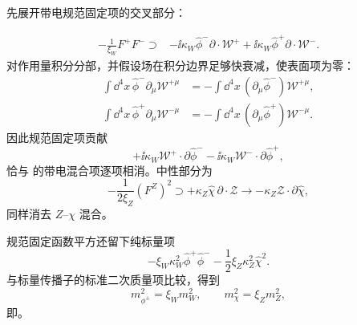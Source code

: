\begin{derivation}
先展开带电规范固定项的交叉部分：

\begin{align*}
 -\frac1{\xi_W}F^+F^-
 \supset{}&-\ii\kappa_W\widehat\phi^-\partial\!\cdot\mathcal W^+
 +\ii\kappa_W\widehat\phi^+\partial\!\cdot\mathcal W^-.
\end{align*}
对作用量积分分部，并假设场在积分边界足够快衰减，使表面项为零：
\begin{align*}
 \int\dd^4 x\,
 \widehat\phi^-\partial_\mu\mathcal W^{+\mu}
 &=-\int\dd^4 x\,
 (\partial_\mu\widehat\phi^-)\mathcal W^{+\mu},\\
 \int\dd^4 x\,
 \widehat\phi^+\partial_\mu\mathcal W^{-\mu}
 &=-\int\dd^4 x\,
 (\partial_\mu\widehat\phi^+)\mathcal W^{-\mu}.
\end{align*}
因此规范固定项贡献
\begin{equation*}
 +\ii\kappa_W\mathcal W^+\!\cdot\partial\widehat\phi^-
 -\ii\kappa_W\mathcal W^-\!\cdot\partial\widehat\phi^+,
\end{equation*}
恰与 的带电混合项逐项相消。中性部分为
\begin{equation*}
 -\frac1{2\xi_Z}(F^Z)^2
 \supset
 +\kappa_Z\widehat\chi\,\partial\!\cdot\mathcal Z
 \longrightarrow
 -\kappa_Z\mathcal Z\!\cdot\partial\widehat\chi,
\end{equation*}
同样消去 $Z$--$\chi$ 混合。

规范固定函数平方还留下纯标量项
\begin{equation*}
 -\xi_W\kappa_W^2\widehat\phi^+\widehat\phi^-
 -\frac12\xi_Z\kappa_Z^2\widehat\chi^2.
\end{equation*}
与标量传播子的标准二次质量项比较，得到
\begin{equation*}
 m_{\phi^\pm}^2=\xi_Wm_W^2,
 \qquad
 m_\chi^2=\xi_Zm_Z^2,
\end{equation*}
即。
\end{derivation}

